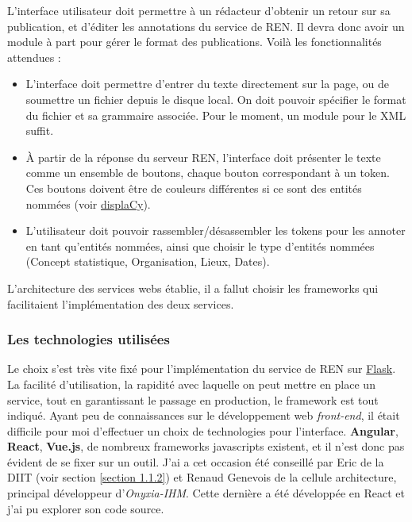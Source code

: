 L'interface utilisateur doit permettre à un rédacteur d'obtenir un retour sur sa publication, et d'éditer les annotations du service de REN. Il devra donc avoir un module à part pour gérer le format des publications. Voilà les fonctionnalités attendues :
\begin{itemize}
    \item L'interface doit permettre d'entrer du texte directement sur la page, ou de soumettre un fichier depuis le disque local. On doit pouvoir spécifier le format du fichier et sa grammaire associée. Pour le moment, un module pour le XML suffit.
    \item À partir de la réponse du serveur REN, l'interface doit présenter le texte comme un ensemble de boutons, chaque bouton correspondant à un token. Ces boutons doivent être de couleurs différentes si ce sont des entités nommées (voir \href{https://spacy.io/usage/visualizers#ent}{displaCy}).
    \item L'utilisateur doit pouvoir rassembler/désassembler les tokens pour les annoter en tant qu'entités nommées, ainsi que choisir le type d'entités nommées (Concept statistique, Organisation, Lieux, Dates).
    \newline
\end{itemize}

L'architecture des services webs établie, il a fallut choisir les frameworks qui facilitaient l'implémentation des deux services.

\label{section 3.2.1 - Architecture des services}

\subsubsection{Les technologies utilisées}
Le choix s'est très vite fixé pour l'implémentation du service de REN sur \href{https://github.com/pallets/flask}{Flask}. La facilité d'utilisation, la rapidité avec laquelle on peut mettre en place un service, tout en garantissant le passage en production, le framework est tout indiqué. Ayant peu de connaissances sur le développement web \textit{front-end}, il était difficile pour moi d'effectuer un choix de technologies pour l'interface. \textbf{Angular}, \textbf{React}, \textbf{Vue.js}, de nombreux frameworks javascripts existent, et il n'est donc pas évident de se fixer sur un outil. J'ai a cet occasion été conseillé par Eric de la DIIT (voir section \ref{section 1.1.2}) et Renaud Genevois de la cellule architecture, principal développeur d'\textit{Onyxia-IHM}. Cette dernière a été développée en React et j'ai pu explorer son code source.
\label{section 3.2.2}

